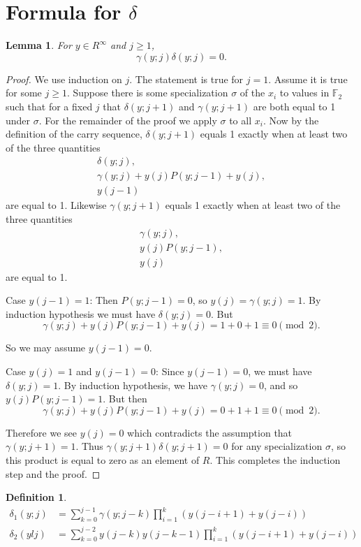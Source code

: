 \documentclass[11pt, oneside]{article}   	%
\newtheorem{lemma}{Lemma}
\newtheorem{definition}{Definition}
\begin{document}
\section{Formula for $\delta$}

\begin{lemma} \label{l gd}
For $y \in R^\infty$ and $j \geq 1$,
\[
\gamma(y;j) \delta(y;j) = 0.
\]
\end{lemma}
\begin{proof} 
We use induction on $j$. The statement is true for $j=1$. Assume it is true for some $j \geq 1$.  Suppose there is some specialization $\sigma$ of the $x_i$ to values in $\mathbb{F}_2$ such that for a fixed $j$ that $\delta(y;j+1)$ and $\gamma(y;j+1)$ are both equal to 1 under $\sigma$. For the remainder of the proof we apply $\sigma$ to all $x_i$. Now by the definition of the carry sequence, $\delta(y;j+1)$ equals 1 exactly when at least two of the three quantities 
\begin{align}
\delta(y;j),\\ 
\gamma(y;j)+ y(j)P(y;j-1)+ y(j),\\ 
y(j-1)
\end{align} 
are equal to 1. 
Likewise $\gamma(y;j+1)$ equals 1 exactly when at least two of the three quantities
\begin{align}
\gamma(y;j),\\ 
y(j)P(y;j-1),\\ 
y(j)
\end{align} 
are equal to 1. 

Case $y(j-1)=1$: Then $P(y;j-1)=0$, so  $y(j) = \gamma(y;j) =1$. By induction hypothesis we must have $\delta(y;j)=0$.  But 
\[
\gamma(y;j)+ y(j)P(y;j-1)+ y(j) = 1+0+1\equiv 0 \pmod 2. 
\]

So we may assume $y(j-1)=0$. 

Case $y(j)=1$ and $y(j-1)=0$: Since $y(j-1)=0$, we must have $\delta(y;j) = 1$. By induction hypothesis, we have $\gamma(y;j) = 0$, and so  $y(j) P(y;j-1) =1$. But then 
\[
\gamma(y;j)+ y(j)P(y;j-1)+ y(j) = 0+1+1\equiv 0 \pmod 2. 
\]

Therefore we see $y(j)=0$ which contradicts the assumption that $\gamma(y;j+1)=1$. Thus $\gamma(y;j+1) \delta(y;j+1) = 0$ for any specialization $\sigma$, so this product is equal to zero as an element of $R$. This completes the induction step and the proof. 
\end{proof} 


\begin{definition} 
\begin{align*}
\delta_1(y; j) &= \sum_{k=0}^{j-1} \gamma(y;j-k) \prod_{i=1}^k (y(j-i+1)+y(j-i))\\
\delta_2(yl j) &= \sum_{k=0}^{j-2} y(j-k)y(j-k-1) \prod_{i=1}^k (y(j-i+1)+y(j-i))
\end{align*}
\end{definition}
\end{document}
